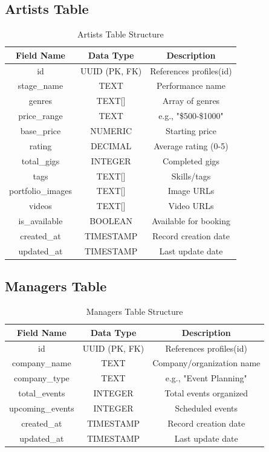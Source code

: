 \documentclass[12pt,a4paper]{report}
\begin{document}
\subsection*{Artists Table}

\begin{table}[H]
\centering
\caption{Artists Table Structure}
\begin{tabular}{|c|c|c|}
\hline
\textbf{Field Name} & \textbf{Data Type} & \textbf{Description} \\
\hline
id & UUID (PK, FK) & References profiles(id) \\
stage\_name & TEXT & Performance name \\
genres & TEXT[] & Array of genres \\
price\_range & TEXT & e.g., "\$500-\$1000" \\
base\_price & NUMERIC & Starting price \\
rating & DECIMAL & Average rating (0-5) \\
total\_gigs & INTEGER & Completed gigs \\
tags & TEXT[] & Skills/tags \\
portfolio\_images & TEXT[] & Image URLs \\
videos & TEXT[] & Video URLs \\
is\_available & BOOLEAN & Available for booking \\
created\_at & TIMESTAMP & Record creation date \\
updated\_at & TIMESTAMP & Last update date \\
\hline
\end{tabular}
\end{table}

\subsection*{Managers Table}

\begin{table}[H]
\centering
\caption{Managers Table Structure}
\begin{tabular}{|c|c|c|}
\hline
\textbf{Field Name} & \textbf{Data Type} & \textbf{Description} \\
\hline
id & UUID (PK, FK) & References profiles(id) \\
company\_name & TEXT & Company/organization name \\
company\_type & TEXT & e.g., "Event Planning" \\
total\_events & INTEGER & Total events organized \\
upcoming\_events & INTEGER & Scheduled events \\
created\_at & TIMESTAMP & Record creation date \\
updated\_at & TIMESTAMP & Last update date \\
\hline
\end{tabular}
\end{table}
\end{document}
